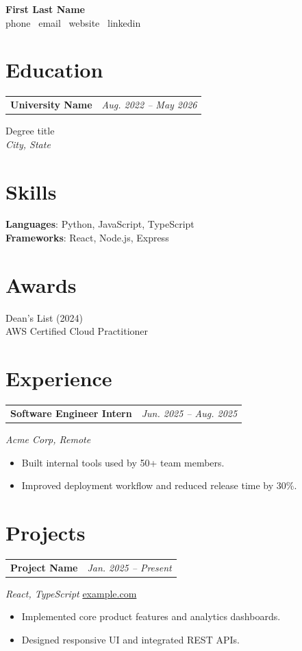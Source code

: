 \documentclass[10pt,letterpaper]{article}
\newcommand{\sectionsep}{\vspace{6pt}}
\begin{document}
\begin{center}
{\Huge\bfseries First Last Name}\\[2pt]
{\small\color{deedymuted}phone \textbar\ email \textbar\ website \textbar\ linkedin}
\end{center}

\vspace{8pt}
\section{Education}
\begin{tabularx}{\linewidth}{Xr}
\textbf{University Name} & \textit{Aug. 2022 -- May 2026}
\end{tabularx}
Degree title\\
\textit{City, State}

\sectionsep
\section{Skills}
\textbf{Languages}: Python, JavaScript, TypeScript\\
\textbf{Frameworks}: React, Node.js, Express

\sectionsep
\section{Awards}
Dean's List (2024)\\
AWS Certified Cloud Practitioner

\sectionsep
\section{Experience}
\begin{tabularx}{\linewidth}{Xr}
\textbf{Software Engineer Intern} & \textit{Jun. 2025 -- Aug. 2025}
\end{tabularx}
\textit{Acme Corp, Remote}
\begin{itemize}
  \item Built internal tools used by 50+ team members.
  \item Improved deployment workflow and reduced release time by 30\%.
\end{itemize}

\sectionsep
\section{Projects}
\begin{tabularx}{\linewidth}{Xr}
\textbf{Project Name} & \textit{Jan. 2025 -- Present}
\end{tabularx}
\textit{React, TypeScript}\,\textbar\,\href{https://example.com}{example.com}
\begin{itemize}
  \item Implemented core product features and analytics dashboards.
  \item Designed responsive UI and integrated REST APIs.
\end{itemize}
\end{document}
